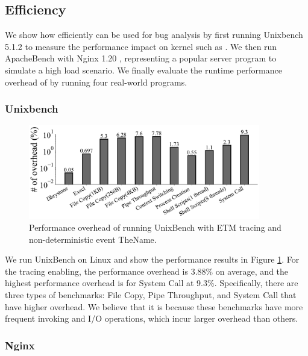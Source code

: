 \subsection{Efficiency} \label{subsec:eva-Efficiency}

We show how efficiently \TheName can be used for bug analysis by first running
Unixbench 5.1.2 \cite{unixbench} to measure the performance impact on kernel
such as \syscall{}. We then run ApacheBench \cite{ApacheBench} with Nginx 1.20
\cite{nginx_1.20.0}, representing a popular server program to simulate a high load
scenario. We finally evaluate the runtime performance overhead of \TheName by running four real-world programs.

\subsubsection{Unixbench} \label{subsec:eva-Performance-Unixbench}

\begin{figure}
    \centering
    \includegraphics[width=0.9\textwidth]{figures/unixbenchoverheadbar.pdf}
    \caption{Performance overhead of running UnixBench with ETM tracing and non-deterministic event TheName.}
    \label{fig:Performance overhead of running UnixBench}
\end{figure}

We run UnixBench on Linux and show the performance results in Figure
\ref{fig:Performance overhead of running UnixBench}. For the tracing enabling,
the performance overhead is 3.88\% on average, and the highest performance
overhead is for System Call at 9.3\%. Specifically, there are three types of
benchmarks: File Copy, Pipe Throughput, and System Call that have higher
overhead. We believe that it is because these benchmarks have more frequent
\syscall{} invoking and I/O operations, which incur larger overhead than others.

\subsubsection{Nginx} \label{subsec:eva-Performance-Nginx}

